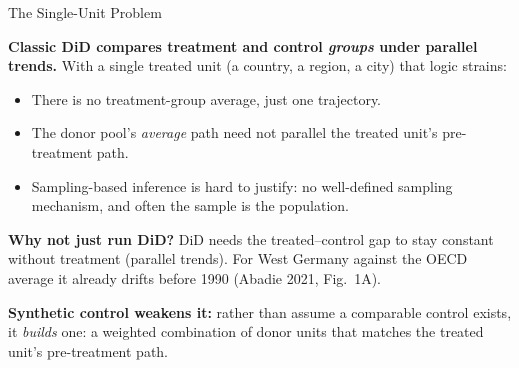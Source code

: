 \documentclass[main.tex]{subfiles}
\begin{document}
\begin{frame}{The Single-Unit Problem}

  \textbf{Classic DiD compares treatment and control \emph{groups} under parallel
  trends.} With a single treated unit (a country, a region, a city) that
  logic strains:
  \begin{itemize}
    \item There is no treatment-group average, just one trajectory.
    \item The donor pool's \emph{average} path need not parallel the treated
      unit's pre-treatment path.
    \item Sampling-based inference is hard to justify: no well-defined
      sampling mechanism, and often the sample is the population.
  \end{itemize}

  \bigskip
  \textbf{Why not just run DiD?} DiD needs the treated--control gap to stay
  constant without treatment (parallel trends). For West Germany against the
  OECD average it already drifts before 1990 (Abadie 2021, Fig.~1A).

  \medskip
  \textbf{Synthetic control weakens it:} rather than assume a comparable control
  exists, it \emph{builds} one: a weighted combination of donor units that
  matches the treated unit's pre-treatment path.

\end{frame}
\end{document}
